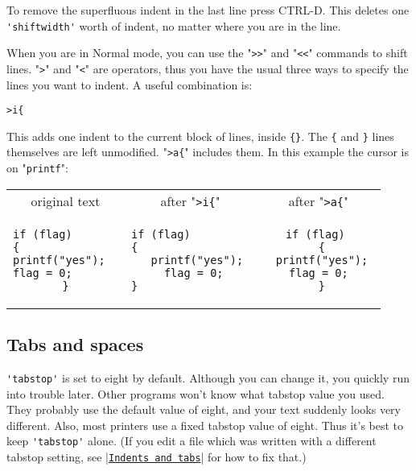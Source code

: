 To remove the superfluous indent in the last line press CTRL-D.
This deletes one \verb!'shiftwidth'! worth of indent, no matter where you are in the line.

When you are in Normal mode, you can use the "\verb!>>!" and "\verb!<<!" commands to shift lines.
"\verb!>!" and "\verb!<!" are operators, thus you have the usual three ways to specify the lines you want to indent.
A useful combination is:

\begin{Verbatim}[samepage=true]
 >i{
\end{Verbatim}

This adds one indent to the current block of lines, inside \verb!{}!.
The \verb!{! and \verb!}! lines themselves are left unmodified.
"\verb!>a{!" includes them.
In this example the cursor is on "\verb!printf!":

\begin{center} \begin{tabular}{|c|c|c|}
				\hline
				original text & after "\verb!>i{!" & after "\verb!>a{!" \\ 
				\begin{minipage}{4cm}
				\begin{verbatim}
if (flag)       
{               
printf("yes");  
flag = 0;       
}
				\end{verbatim}
				\end{minipage}
& 
				\begin{minipage}{4cm}
				\begin{verbatim}
if (flag)         
{                 
  printf("yes");
  flag = 0; 
}                 
				\end{verbatim}
				\end{minipage}
&
				\begin{minipage}{4cm}
				\begin{verbatim}
if (flag) 
  { 
  printf("yes"); 
  flag = 0;  
  } 
				\end{verbatim}
				\end{minipage} \\
				\hline
\end{tabular} \end{center}
\subsection{Tabs and spaces}
\verb!'tabstop'! is set to eight by default.
Although you can change it, you quickly run into trouble later.
Other programs won't know what tabstop value you used.
They probably use the default value of eight, and your text suddenly looks very different.
Also, most printers use a fixed tabstop value of eight.
Thus it's best to keep \verb!'tabstop'! alone.
(If you edit a file which was written with a different tabstop setting, see |\hyperref[Indents and tabs]{\texttt{Indents and tabs}}| for how to fix that.)

